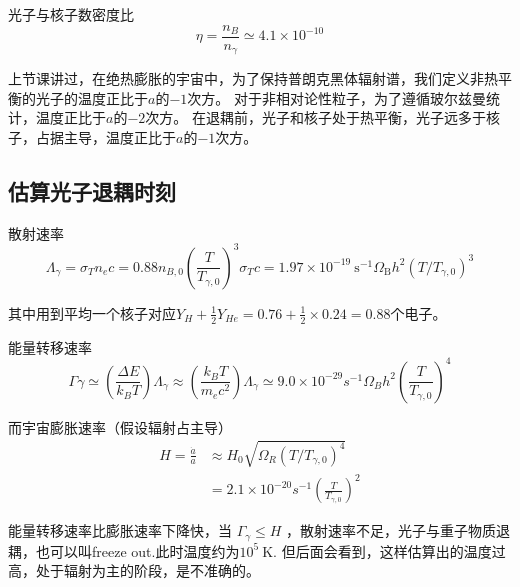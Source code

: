\documentclass[12pt]{ctexart}
\begin{document}
光子与核子数密度比
\begin{equation}
    \eta = \frac{n_{B}}{n_{\gamma}} \simeq 4.1\times 10^{-10}
\end{equation}

上节课讲过，在绝热膨胀的宇宙中，为了保持普朗克黑体辐射谱，我们定义非热平衡的光子的温度正比于$a$的$-1$次方。
对于非相对论性粒子，为了遵循玻尔兹曼统计，温度正比于$a$的$-2$次方。
在退耦前，光子和核子处于热平衡，光子远多于核子，占据主导，温度正比于$a$的$-1$次方。

\subsection*{估算光子退耦时刻}

散射速率
\begin{equation}
    \Lambda_\gamma=\sigma_{T} n_{e} c=0.88 n_{B,0}\left(\frac{T}{T_{\gamma,0}}\right)^{3} \sigma_{T} c=1.97 \times 10^{-19} \mathrm{~s}^{-1} \Omega_{\mathrm{B}}{h }^{2}\left(T / T_{\gamma,0}\right)^{3}
\end{equation}

其中用到平均一个核子对应$Y_H+\frac{1}{2}Y_{He}=0.76+\frac{1}{2}\times 0.24=0.88$个电子。

能量转移速率
\begin{equation}
    \Gamma \gamma \simeq\left(\frac{\Delta E}{k_{B} T}\right) \Lambda_{\gamma} \approx\left(\frac{k_{B} T}{m_{e} c^{2}}\right) \Lambda_{\gamma} \simeq 9.0 \times 10^{-29} s^{-1} \Omega_{B} h^{2}\left(\frac{T}{T_{\gamma,{0}}}\right)^{4}
\end{equation}

而宇宙膨胀速率（假设辐射占主导）
\begin{equation}
    \begin{aligned}
        H=\frac{\dot{a}}{a} & \approx H_{0} \sqrt{\Omega_R\left(T / T_{\gamma,{0}}\right)^{4}} \\
    &=2.1\times 10^{-20} s^{-1} \left(\frac{T}{T_{\gamma,{0}}}\right)^{2}
    \end{aligned}
\end{equation}

能量转移速率比膨胀速率下降快，当 $\Gamma_{\gamma} \leq H$ ，散射速率不足，光子与重子物质退耦，也可以叫freeze out.此时温度约为$10^5 \mathrm{~K}$.
但后面会看到，这样估算出的温度过高，处于辐射为主的阶段，是不准确的。
\end{document}

